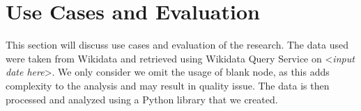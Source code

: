 \section{Use Cases and Evaluation}

This section will discuss use cases and evaluation of the research. The data used were taken from Wikidata and retrieved using Wikidata Query Service on <\textit{input date here}>. We only consider we omit the usage of blank
node, as this adds complexity to the analysis and may result in quality issue.
The data is then processed and analyzed using a Python library that we created.













